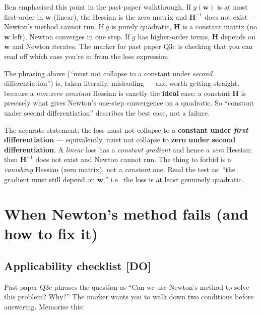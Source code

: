 \documentclass[11pt, a4paper]{article}
\newcommand{\doflag}{\textcolor{defBd}{\textbf{[DO]}}\,}
\begin{document}
\begin{notebox}
Ben emphasised this point in the past-paper walkthrough. If $g(\mathbf{w})$ is at most first-order in $\mathbf{w}$ (linear), the Hessian is the zero matrix and $\mathbf{H}^{-1}$ does not exist — Newton's method cannot run. If $g$ is purely quadratic, $\mathbf{H}$ is a constant matrix (no $\mathbf{w}$ left), Newton converges in one step. If $g$ has higher-order terms, $\mathbf{H}$ depends on $\mathbf{w}$ and Newton iterates. The marker for past paper Q3c is checking that you can read off which case you're in from the loss expression.
\end{notebox}

\begin{notebox}
The phrasing above (``must not collapse to a constant under \emph{second} differentiation'') is, taken literally, misleading — and worth getting straight, because a \emph{non-zero constant} Hessian is exactly the \textbf{ideal} case: a constant $\mathbf{H}$ is precisely what gives Newton's one-step convergence on a quadratic. So ``constant under second differentiation'' describes the best case, not a failure.

The accurate statement: the loss must not collapse to a \textbf{constant under \emph{first} differentiation} — equivalently, must not collapse to \textbf{zero under second differentiation}. A \emph{linear} loss has a \emph{constant gradient} and hence a \emph{zero} Hessian; then $\mathbf{H}^{-1}$ does not exist and Newton cannot run. The thing to forbid is a \emph{vanishing} Hessian (zero matrix), not a \emph{constant} one. Read the test as: ``the gradient must still depend on $\mathbf{w}$,'' i.e.\ the loss is at least genuinely quadratic.
\end{notebox}

\section{When Newton's method fails (and how to fix it)}

\subsection{Applicability checklist \doflag}

Past-paper Q3c phrases the question as ``Can we use Newton's method to solve this problem? Why?'' The marker wants you to walk down two conditions before answering. Memorise this:
\end{document}
